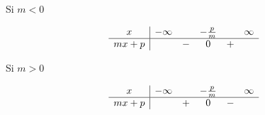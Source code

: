 \begin{minipage}{0.485\textwidth}
    \begin{center}

        Si \( m<0\)
        \vspace{5mm}

                  

               \begin{equation*}
                   \begin{array}[]{c|ccccc}
                       x&-\infty&&-\frac{ p }{ m }&&\infty\\
                         \hline
                         mx+p&&-&0&+&\\ 
                          \end{array}
                      \end{equation*}
    \end{center}
\end{minipage}
\hspace{1mm}
\begin{minipage}{0.485\textwidth}
    \begin{center}
        Si \( m>0\)
        \vspace{5mm}

                    

               \begin{equation*}
                   \begin{array}[]{c|ccccc}
                       x&-\infty&&-\frac{ p }{ m }&&\infty\\
                         \hline
                         mx+p&&+&0&-&\\ 
                          \end{array}
                      \end{equation*}
    \end{center}
\end{minipage}
